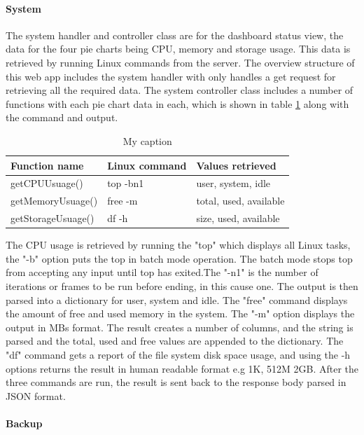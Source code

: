 \paragraph{System}

The system handler and controller class are for the dashboard status view, the data for the four pie charts being CPU, memory and storage usage. This data is retrieved by running Linux commands from the server. The overview structure of this web app includes the system handler with only handles a get request for retrieving all the required data. The system controller class includes a number of functions with each pie chart data in each, which is shown in table \ref{tb:system} along with the command and output. 

\begin{table}[!h]
\centering
\caption{My caption}
\label{tb:system}
\begin{tabular}{|l|l|l|}
\hline
\rowcolor{green!20}
Function name    & Linux command & Values retrieved       \\ \hline
getCPUUsuage()     & top -bn1      & user, system, idle     \\ \hline
getMemoryUsuage()  & free -m       & total, used, available \\ \hline
getStorageUsuage() & df -h         & size, used, available  \\ \hline
\end{tabular}
\end{table}

The CPU usage is retrieved by running the "top" which displays all Linux tasks, the "-b" option puts the top in batch mode operation. The batch mode stops top from accepting any input until top has exited.The "-n1" is the number of iterations or frames to be run before ending, in this cause one. The output is then parsed into a dictionary for user, system and idle. 
The "free" command displays the amount of free and used memory in the system. The "-m" option displays the output in MBs format. The result creates a number of columns, and the string is parsed and the total, used and free values are appended to the dictionary. 
The "df" command gets a report of the file system disk space usage, and using the -h options returns the result in human readable format e.g 1K, 512M 2GB. After the three commands are run, the result is sent back to the response body parsed in JSON format.

\paragraph{Backup}

